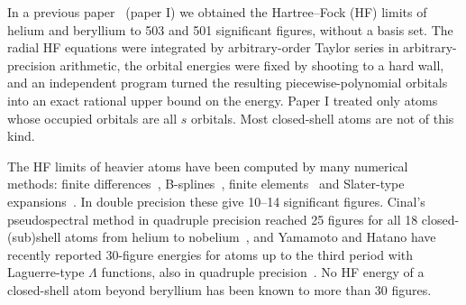 \documentclass[aps,pra,reprint,superscriptaddress,amsmath,amssymb,longbibliography]{revtex4-2}
\begin{document}
In a previous paper~\cite{FROST1} (paper I) we obtained the Hartree--Fock (HF) limits of helium and beryllium to 503 and 501 significant figures, without a basis set. The radial HF equations were integrated by arbitrary-order Taylor series in arbitrary-precision arithmetic, the orbital energies were fixed by shooting to a hard wall, and an independent program turned the resulting piecewise-polynomial orbitals into an exact rational upper bound on the energy. Paper I treated only atoms whose occupied orbitals are all $s$ orbitals. Most closed-shell atoms are not of this kind.

The HF limits of heavier atoms have been computed by many numerical methods: finite differences~\cite{FroeseFischer1977,Kobus2013,KobusLehtola2025}, B-splines~\cite{Saito2009}, finite elements~\cite{Lehtola2019} and Slater-type expansions~\cite{Clementi1974}. In double precision these give 10--14 significant figures. Cinal's pseudospectral method in quadruple precision reached 25 figures for all 18 closed-(sub)shell atoms from helium to nobelium~\cite{Cinal2020}, and Yamamoto and Hatano have recently reported 30-figure energies for atoms up to the third period with Laguerre-type $\Lambda$ functions, also in quadruple precision~\cite{Yamamoto2026}. No HF energy of a closed-shell atom beyond beryllium has been known to more than 30 figures.
\end{document}

